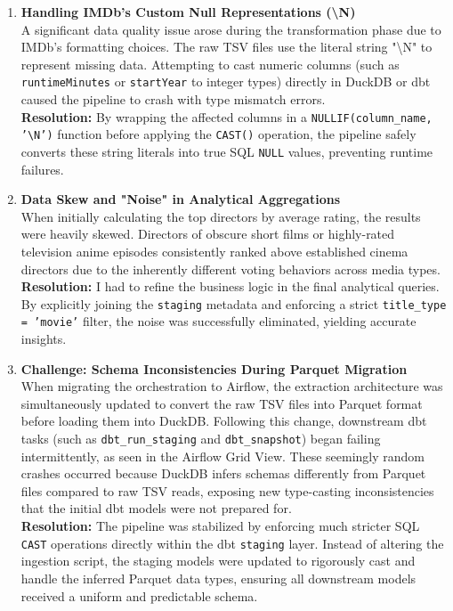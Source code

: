 \documentclass[runningheads]{llncs}
\begin{document}
\begin{enumerate}
    \item \textbf{Handling IMDb's Custom Null Representations (\textbackslash N)} \\
    A significant data quality issue arose during the transformation phase due to IMDb's formatting choices. The raw TSV files use the literal string "\textbackslash N" to represent missing data. Attempting to cast numeric columns (such as \texttt{runtimeMinutes} or \texttt{startYear} to integer types) directly in DuckDB or dbt caused the pipeline to crash with type mismatch errors. \\
    \textbf{Resolution:} By wrapping the affected columns in a \texttt{NULLIF(column\_name, '\textbackslash N')} function before applying the \texttt{CAST()} operation, the pipeline safely converts these string literals into true SQL \texttt{NULL} values, preventing runtime failures.

    \item \textbf{Data Skew and "Noise" in Analytical Aggregations} \\
    When initially calculating the top directors by average rating, the results were heavily skewed. Directors of obscure short films or highly-rated television anime episodes consistently ranked above established cinema directors due to the inherently different voting behaviors across media types. \\
    \textbf{Resolution:} I had to refine the business logic in the final analytical queries. By explicitly joining the \texttt{staging} metadata and enforcing a strict \texttt{title\_type = 'movie'} filter, the noise was successfully eliminated, yielding accurate insights.

   \item \textbf{Challenge: Schema Inconsistencies During Parquet Migration} \\
    When migrating the orchestration to Airflow, the extraction architecture was simultaneously updated to convert the raw TSV files into Parquet format before loading them into DuckDB. Following this change, downstream dbt tasks (such as \texttt{dbt\_run\_staging} and \texttt{dbt\_snapshot}) began failing intermittently, as seen in the Airflow Grid View. These seemingly random crashes occurred because DuckDB infers schemas differently from Parquet files compared to raw TSV reads, exposing new type-casting inconsistencies that the initial dbt models were not prepared for. \\
    \textbf{Resolution:} The pipeline was stabilized by enforcing much stricter SQL \texttt{CAST} operations directly within the dbt \texttt{staging} layer. Instead of altering the ingestion script, the staging models were updated to rigorously cast and handle the inferred Parquet data types, ensuring all downstream models received a uniform and predictable schema.
\end{enumerate}
\end{document}
